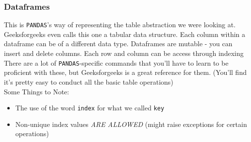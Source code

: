 \documentclass[english, 10pt]{article}
\begin{document}
\subsubsection{Dataframes}

This is \texttt{PANDAS}'s way of representing the table abstraction we were looking at. Geeksforgeeks even calls this one a tabular data structure. Each column within a dataframe can be of a different data type. Dataframes are mutable - you can insert and delete columns. Each row and column can be access through indexing\\

There are a lot of \texttt{PANDAS}-specific commands that you'll have to learn to be proficient with these, but Geeksforgeeks is a great reference for them. (You'll find it's pretty easy to conduct all the basic table operations)\\

Some Things to Note:
\begin{itemize}
	\item The use of the word \texttt{index} for what we called \texttt{key}  
	\item Non-unique index values \textit{ARE ALLOWED} (might raise exceptions for certain operations)
\end{itemize}
\end{document}
